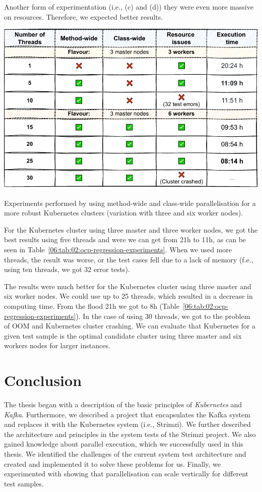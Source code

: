 Another form of experimentation (i.e., (c) and (d)) they were even more massive on resources.
Therefore, we expected better results.
\begin{table}[ht!]
    \centering
    \includegraphics[scale=0.8]{obrazky-figures/08-experiments/regression/06-exp-ocp-regression}
    \caption{Experiments performed by using method-wide and class-wide parallelisation for a more robust Kubernetes
    clusters (variation with three and six worker nodes).}
    \label{06:tab:02:ocp-regression-experiments}
\end{table}
For the Kubernetes cluster using three master and three worker nodes, we got the best results using five threads and were
we can get from 21h to 11h, as can be seen in Table~\ref{06:tab:02:ocp-regression-experiments}.
When we used more threads, the result was worse, or the test cases fell due to a lack of memory (f.e., using
ten threads, we got 32 error tests).

The results were much better for the Kubernetes cluster using three master and six worker nodes.
We could use up to 25 threads, which resulted in a decrease in computing time.
From the flood 21h we got to 8h (Table~\ref{06:tab:02:ocp-regression-experiments}).
In the case of using 30 threads, we got to the problem of OOM and Kubernetes cluster crashing.
We can evaluate that Kubernetes for a given test sample is the optimal candidate
cluster using three master and six workers nodes for larger instances.

\chapter{Conclusion}
\label{08:chapter:title}

The thesis began with a description of the basic principles of \emph{Kubernetes} and \emph{Kafka}.
Furthermore, we described a project that encapsulates the Kafka system and replaces it with the Kubernetes system (i.e., Strimzi).
We further described the architecture and principles in the system tests of the Strimzi project.
We also gained knowledge about parallel execution, which we successfully used in this thesis.
We identified the challenges of the current system test architecture and created and implemented it to solve these problems for us.
Finally, we experimented with showing that parallelisation can scale vertically for different test samples.

